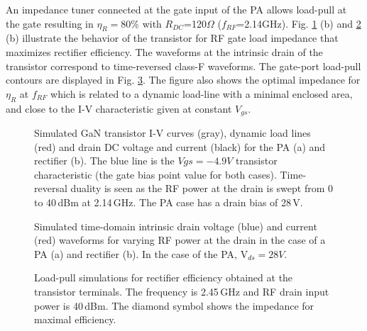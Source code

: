 \documentclass[twocolumn]{el-author}
\begin{document}
An impedance tuner connected at the gate input of the PA allows load-pull at the gate resulting in $\eta_{R}=80\%$ with $R_{DC}$=120$\Omega$ ($f_{RF}$=2.14GHz). Fig. \ref{Simulations_A} (b) and \ref{Simulations_B} (b)  illustrate the behavior of the transistor for RF gate load impedance that maximizes rectifier efficiency. The waveforms at the intrinsic drain of the transistor correspond to time-reversed class-F waveforms. The gate-port load-pull contours are displayed in Fig. \ref{Simulation_LP}. The figure also shows the  optimal impedance for $\eta_{R}$ at $f_{RF}$ which is related to a dynamic load-line with a minimal enclosed area, and close to the I-V characteristic given at constant $V_{gs}$.
%
\begin{figure}[h]
\caption{Simulated GaN transistor I-V curves (gray), dynamic load lines (red) and drain DC voltage and current (black) for the PA (a) and rectifier (b). The blue line is the $Vgs=-4.9V$ transistor characteristic (the gate bias point value for both cases). Time-reversal duality is seen as the RF power at the drain is swept from 0 to 40\,dBm at 2.14\,GHz. The PA case has a drain bias of 28\,V.}\label{Simulations_A}
\end{figure}
%
\begin{figure}[h]
\caption{Simulated time-domain intrinsic drain voltage (blue) and current (red) waveforms for varying RF power at the drain in the case of a PA (a) and rectifier (b). In the case of the PA, V$_{ds}=28V$.}
\label{Simulations_B}
\end{figure}
%
%
\begin{figure}[h]
\caption{Load-pull simulations for rectifier efficiency obtained at the transistor terminals. The frequency is 2.45\,GHz and RF drain input power is 40\,dBm. The diamond symbol shows the impedance for maximal efficiency.}\label{Simulation_LP}
\end{figure}
%
%
\end{document}
